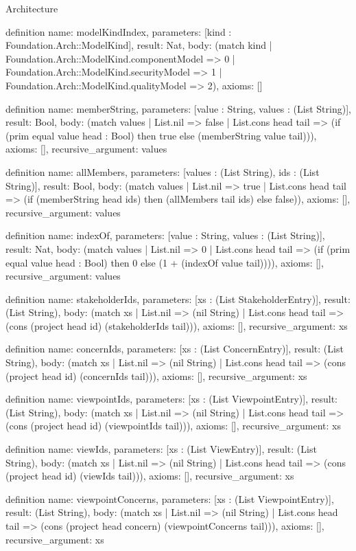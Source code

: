 \begin{lexlean}{Architecture}
\begin{semanticmodule}
definition{
  name: modelKindIndex,
  parameters: [kind : Foundation.Arch::ModelKind],
  result: Nat,
  body: (match kind
    | Foundation.Arch::ModelKind.componentModel => 0
    | Foundation.Arch::ModelKind.securityModel => 1
    | Foundation.Arch::ModelKind.qualityModel => 2),
  axioms: []
}

definition{
  name: memberString,
  parameters: [value : String, values : (List String)],
  result: Bool,
  body: (match values
    | List.nil => false
    | List.cons head tail => (if (prim equal value head : Bool) then true else (memberString value tail))),
  axioms: [],
  recursive_argument: values
}

definition{
  name: allMembers,
  parameters: [values : (List String), ids : (List String)],
  result: Bool,
  body: (match values
    | List.nil => true
    | List.cons head tail => (if (memberString head ids) then (allMembers tail ids) else false)),
  axioms: [],
  recursive_argument: values
}

definition{
  name: indexOf,
  parameters: [value : String, values : (List String)],
  result: Nat,
  body: (match values
    | List.nil => 0
    | List.cons head tail => (if (prim equal value head : Bool) then 0 else (1 + (indexOf value tail)))),
  axioms: [],
  recursive_argument: values
}

definition{
  name: stakeholderIds,
  parameters: [xs : (List StakeholderEntry)],
  result: (List String),
  body: (match xs
    | List.nil => (nil String)
    | List.cons head tail => (cons (project head id) (stakeholderIds tail))),
  axioms: [],
  recursive_argument: xs
}

definition{
  name: concernIds,
  parameters: [xs : (List ConcernEntry)],
  result: (List String),
  body: (match xs
    | List.nil => (nil String)
    | List.cons head tail => (cons (project head id) (concernIds tail))),
  axioms: [],
  recursive_argument: xs
}

definition{
  name: viewpointIds,
  parameters: [xs : (List ViewpointEntry)],
  result: (List String),
  body: (match xs
    | List.nil => (nil String)
    | List.cons head tail => (cons (project head id) (viewpointIds tail))),
  axioms: [],
  recursive_argument: xs
}

definition{
  name: viewIds,
  parameters: [xs : (List ViewEntry)],
  result: (List String),
  body: (match xs
    | List.nil => (nil String)
    | List.cons head tail => (cons (project head id) (viewIds tail))),
  axioms: [],
  recursive_argument: xs
}

definition{
  name: viewpointConcerns,
  parameters: [xs : (List ViewpointEntry)],
  result: (List String),
  body: (match xs
    | List.nil => (nil String)
    | List.cons head tail => (cons (project head concern) (viewpointConcerns tail))),
  axioms: [],
  recursive_argument: xs
}


\end{semanticmodule}
\end{lexlean}
